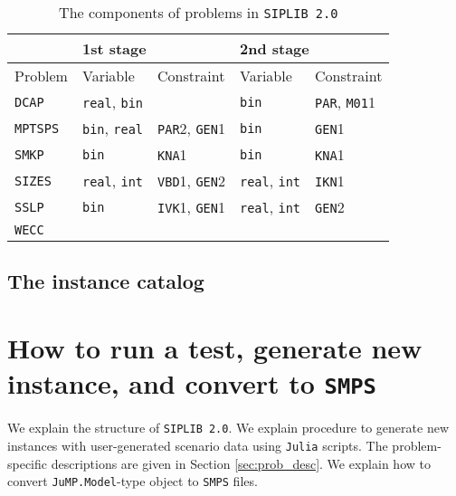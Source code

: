 \begin{table}[H]
	\centering
	\caption{The components of problems in \texttt{SIPLIB 2.0}}
	\label{table:prob_class}
	\begin{tabular}{@{}lllll@{}}
		\toprule
		& \multicolumn{2}{l}{1st stage}                              & \multicolumn{2}{l}{2nd stage}                             \\ \midrule
		Problem & Variable                    & Constraint                   & Variable                    & Constraint                  \\ \midrule
		\texttt{DCAP}    & \texttt{real}, \texttt{bin} &                              & \texttt{bin}                & \texttt{PAR}, \texttt{M01}1 \\
		\texttt{MPTSPS}  & \texttt{bin}, \texttt{real} & \texttt{PAR}2, \texttt{GEN}1 & \texttt{bin}                & \texttt{GEN}1               \\
		\texttt{SMKP}    & \texttt{bin}                & \texttt{KNA}1                & \texttt{bin}                & \texttt{KNA}1               \\
		\texttt{SIZES}   & \texttt{real}, \texttt{int} & \texttt{VBD}1, \texttt{GEN}2 & \texttt{real}, \texttt{int} & \texttt{IKN}1               \\
		\texttt{SSLP}    & \texttt{bin}                & \texttt{IVK}1, \texttt{GEN}1 & \texttt{real}, \texttt{int} & \texttt{GEN}2               \\
		\texttt{WECC}    &                             &                              &                             &                             \\ \bottomrule
	\end{tabular}

\end{table}

\subsection{The instance catalog}

\section{How to run a test, generate new instance, and convert to \texttt{SMPS}}

We explain the structure of \texttt{SIPLIB 2.0}. We explain procedure to generate new instances with user-generated scenario data using \texttt{Julia} scripts. The problem-specific descriptions are given in Section \ref{sec:prob_desc}. We explain how to convert \texttt{JuMP.Model}-type object to \texttt{SMPS} files.

